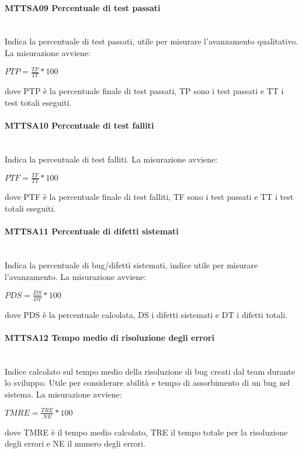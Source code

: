 \paragraph{MTTSA09 Percentuale di test passati}\-\\
Indica la percentuale di test passati, utile per misurare l'avanzamento qualitativo. La misurazione avviene:
\begin{center}
	\item $PTP = \frac{TP}{TT}*100$
\end{center}
dove PTP è la percentuale finale di test passati, TP sono i test passati e TT i test totali eseguiti.

\paragraph{MTTSA10 Percentuale di test falliti}\-\\
Indica la percentuale di test falliti. La misurazione avviene:
\begin{center}
	\item $PTF = \frac{TF}{TT}*100$
\end{center}
dove PTF è la percentuale finale di test falliti, TF sono i test passati e TT i test totali eseguiti.

\paragraph{MTTSA11 Percentuale di difetti sistemati}\-\\
Indica la percentuale di bug/difetti sistemati, indice utile per misurare l'avanzamento. La misurazione avviene:
\begin{center}
	\item $PDS = \frac{DS}{DT}*100$
\end{center}
dove PDS è la percentuale calcolata, DS i difetti sistemati e DT i difetti totali.

\paragraph{MTTSA12 Tempo medio di risoluzione degli errori}\-\\
Indice calcolato sul tempo medio della risoluzione di bug creati dal team durante lo sviluppo. Utile per considerare abilità e tempo di assorbimento di un bug nel sistema. La misurazione avviene:
\begin{center}
	\item $TMRE = \frac{TRE}{NE}*100$
\end{center}
dove TMRE è il tempo medio calcolato, TRE il tempo totale per la risoluzione degli errori e NE il numero degli errori.

